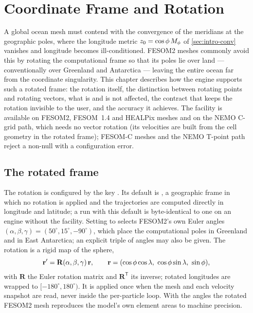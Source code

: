 \chapter{Coordinate Frame and Rotation}\label{ch:frame}

A global ocean mesh must contend with the convergence of the meridians at the geographic poles, where
the longitude metric $z_{0}=\cos\phi\,M_{\phi}$ of \cref{sec:intro-conv} vanishes and longitude becomes
ill-conditioned. FESOM2 meshes commonly avoid this by rotating the computational frame so that its
poles lie over land --- conventionally over Greenland and Antarctica --- leaving the entire ocean far from
the coordinate singularity. This chapter describes how the engine supports such a rotated frame: the
rotation itself, the distinction between rotating points and rotating vectors, what is and is not
affected, the contract that keeps the rotation invisible to the user, and the accuracy it achieves. The
facility is available on FESOM2, FESOM~1.4 and HEALPix meshes and on the NEMO C-grid path, which
needs no vector rotation (its velocities are built from the cell geometry in the rotated frame);
FESOM-C meshes and the NEMO T-point path reject a non-null  with a configuration
error.

\section{The rotated frame}\label{sec:frame-rotation}

The rotation is configured by the key . Its default is , a geographic
frame in which no rotation is applied and the trajectories are computed directly in longitude and
latitude; a run with this default is byte-identical to one on an engine without the facility. Setting
 to  selects FESOM2's own Euler angles $(\alpha,\beta,\gamma)=
(50^\circ,15^\circ,-90^\circ)$, which place the computational poles in Greenland and in East Antarctica;
an explicit triple of angles may also be given. The rotation is a rigid map of the sphere,
\begin{equation}\label{eq:frame-map}
  \mathbf{r}' = \mathbf{R}(\alpha,\beta,\gamma)\,\mathbf{r},\qquad
  \mathbf{r}=(\cos\latx\cos\lonx,\ \cos\latx\sin\lonx,\ \sin\latx),
\end{equation}
with $\mathbf{R}$ the Euler rotation matrix and $\mathbf{R}^{\mathsf T}$ its inverse; rotated longitudes are
wrapped to $[-180^\circ,180^\circ)$. It is applied once when the mesh and each velocity snapshot are read,
never inside the per-particle loop. With the  angles the rotated FESOM2 mesh reproduces the
model's own element areas to machine precision.

